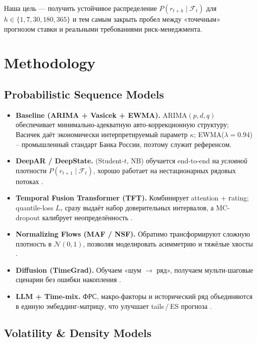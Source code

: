 Наша цель — получить устойчивое распределение
\(P(r_{t+h}\mid\mathcal F_t)\) для
\(h \in \{1,7,30,180,365\}\) и тем самым закрыть пробел между
«точечным» прогнозом ставки и реальными требованиями риск-менеджмента.


\section{Methodology}

\subsection{Probabilistic Sequence Models}

\begin{itemize}
  \item \textbf{Baseline (ARIMA + Vasicek + EWMA).}  ARIMA$(p,d,q)$
        обеспечивает минимально-адекватную авто-коррекционную структуру;
        Васичек даёт экономически интерпретируемый
        параметр $\kappa$; EWMA($\lambda{=}0.94$) – промышленный
        стандарт Банка России, поэтому служит референсом.
  \item \textbf{DeepAR / DeepState.} (Student-$t$, NB) обучается end-to-end на
        \emph{условной} плотности $\!P(r_{t+1}\mid\mathcal F_t)$,
        хорошо работает на нестационарных рядовых потоках
        \autocite{salinas2020deepar}.
  \item \textbf{Temporal Fusion Transformer (TFT).}  Комбинирует
        attention + гating; quantile-loss $L_\tau$ сразу выдаёт набор
        доверительных интервалов, а MC-dropout калибрует 
        неопределённость \autocite{lim2024tft,vaswani2024transformers}.
  \item \textbf{Normalizing Flows (MAF / NSF).}  Обратимо
        трансформируют сложную плотность в $\mathcal N(0,1)$,
        позволяя моделировать асимметрию и тяжёлые хвосты
        \autocite{rasouli2023flows}.
  \item \textbf{Diffusion (TimeGrad).}  Обучаем «шум $\rightarrow$ ряд»,
        получаем мульти-шаговые сценарии без ошибки накопления
        \autocite{zangeneh2024diffusion}.
  \item \textbf{LLM + Time-mix.}  ФРС, макро-факторы и
        исторический ряд объединяются в единую эмбеддинг-матрицу,
        что улучшает tails / ES прогноза
        \autocite{gao2024fedspeak,chang2024forecasting}.
\end{itemize}

\subsection{Volatility \& Density Models}

